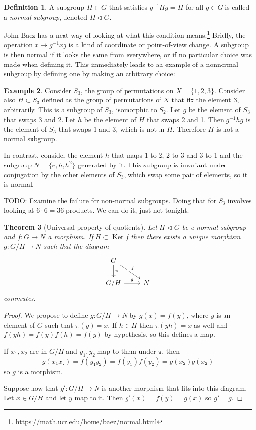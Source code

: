 \documentclass[11pt]{article}
\newtheorem{theo}{Theorem}
\theoremstyle{definition}
\newtheorem{defi}[theo]{Definition}
\newtheorem{exam}[theo]{Example}
\DeclareMathOperator{\ke}{Ker}
\begin{document}
\begin{defi}
A subgroup $H \subset G$ that satisfies $g^{-1} H g = H$ for all $g \in G$
is called a \emph{normal subgroup}, denoted $H \triangleleft G$.
\end{defi}


John Baez has a neat way of looking at what this condition means.\footnote{https://math.ucr.edu/home/baez/normal.html}
Briefly, the operation $x \mapsto g^{-1} x g$ is a kind of coordinate or
point-of-view change.
A subgroup is then normal if it looks the same from everywhere,
or if no particular choice was made when defining it.
This immediately leads to an example of a nonnormal subgroup by defining one by
making an arbitrary choice:


\begin{exam}
Consider $S_3$, the group of permutations on $X = \{1,2,3\}$.
Consider also $H \subset S_3$ defined as the group of permutations of $X$ that
fix the element $3$, arbitrarily.
This is a subgroup of $S_3$, isomorphic to $S_2$.
Let $g$ be the element of $S_3$ that swaps 3 and 2.
Let $h$ be the element of $H$ that swaps 2 and 1.
Then $g^{-1} h g$ is the element of $S_3$ that swaps 1 and 3, which is not in $H$.
Therefore $H$ is not a normal subgroup.

In contrast, consider the element $h$ that maps 1 to 2, 2 to 3 and 3 to 1 and
the subgroup $N = \{e, h, h^2\}$ generated by it.
This subgroup is invariant under conjugation by the other elements of $S_3$,
which swap some pair of elements, so it is normal.
\end{exam}


TODO: Examine the failure for non-normal subgroups.
Doing that for $S_3$ involves looking at $6 \cdot 6 = 36$ products.
We can do it, just not tonight.


\begin{theo}[Universal property of quotients]
Let $H \triangleleft G$ be a normal subgroup and $f : G \to N$ a morphism.
If $H \subset \ke f$ then there exists a unique morphism $g : G/H \to N$ such
that the diagram
$$
\begin{tikzcd}
G \ar[d,"\pi"] \ar[dr,"f"] & 
\\
G/H \ar[r,"g"] & N
\end{tikzcd}
$$
commutes.
\end{theo}

\begin{proof}
We propose to define $g : G/H \to N$ by $g(x) = f(y)$, where $y$ is an element
of $G$ such that $\pi(y) = x$.
If $h \in H$ then $\pi(yh) = x$ as well and $f(yh) = f(y) f(h) = f(y)$ by
hypothesis, so this defines a map.

If $x_1, x_2$ are in $G/H$ and $y_1, y_2$ map to them under $\pi$, then
$$
g(x_1 x_2)
= f(y_1 y_2)
= f(y_1) f(y_2)
= g(x_2) g(x_2)
$$
so $g$ is a morphism.

Suppose now that $g' : G/H \to N$ is another morphism that fits into this diagram.
Let $x \in G/H$ and let $y$ map to it.
Then
$
g'(x) = f(y) = g(x)
$
so $g' = g$.
\end{proof}
\end{document}
